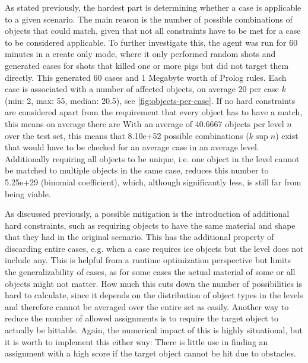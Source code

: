 As stated previously, the hardest part is determining whether a case is applicable to a given scenario.
The main reason is the number of possible combinations of objects that could match, given that not all constraints have to be met for a case to be considered applicable.
To further investigate this, the agent was run for 60 minutes in a create only mode, where it only performed random shots and generated cases for shots that killed one or more pigs but did not target them directly.
This generated 60 cases and 1 Megabyte worth of Prolog rules. Each case is associated with a number of affected objects, on average 20 per case $k$ (min: 2, max: 55, median: 20.5), see \ref{fig:objects-per-case}.
If no hard constraints are considered apart from the requirement that every object has to have a match, this means on average there are
With an average of 40.6667 objects per level $n$ over the test set, this means that
8.10e+52 possible combinations ($k\sup{n}$) exist that would have to be checked for an average case in an average level.
Additionally requiring all objects to be unique, i.e. one object in the level cannot be matched to multiple objects in the same case, reduces this number to
5.25e+29 (binomial coefficient), which, although significantly less, is still far from being viable.


As discussed previously, a possible mitigation is the introduction of additional hard constraints, such as requiring objects to have the same material and shape that they had in the original scenario.
This has the additional property of discarding entire cases, e.g. when a case requires ice objects but the level does not include any.
This is helpful from a runtime optimization perspective but limits the generalizability of cases, as for some cases the actual material of some or all objects might not matter.
How much this cuts down the number of possibilities is hard to calculate, since it depends on the distribution of object types in the levels and therefore cannot be averaged over the entire set as easily.
Another way to reduce the number of allowed assignments is to require the target object to actually be hittable.
Again, the numerical impact of this is highly situational, but it is worth to implement this either way:
There is little use in finding an assignment with a high score if the target object cannot be hit due to obstacles.

